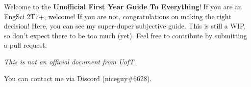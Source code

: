 Welcome to the \textbf{Unofficial First Year Guide To Everything}! If you are an EngSci 2T7+, welcome! If you are not, congratulations on making the right decision! Here, you can see my super-duper subjective guide. This is still a WIP, so don't expect there to be too much (yet). Feel free to contribute by submitting a pull request.

\bigskip
\centerline{\emph{This is not an official document from UofT.}}
\bigskip

You can contact me via Discord (niceguy\#6628).
